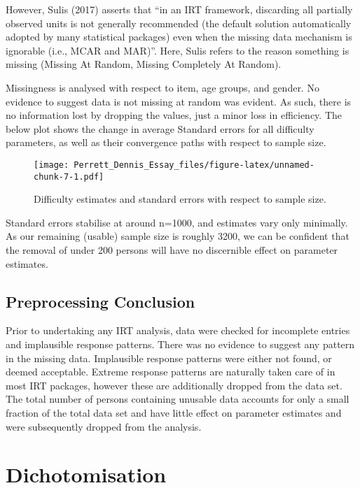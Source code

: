 \documentclass[
  man,floatsintext]{apa6}
\begin{document}
However, Sulis (2017) asserts that ``in an IRT framework, discarding all partially observed units is not generally recommended (the default solution automatically adopted by many statistical packages) even when the missing data mechanism is ignorable (i.e., MCAR and MAR)''. Here, Sulis refers to the reason something is missing (Missing At Random, Missing Completely At Random).

Missingness is analysed with respect to item, age groups, and gender. No evidence to suggest data is not missing at random was evident. As such, there is no information lost by dropping the values, just a minor loss in efficiency. The below plot shows the change in average Standard errors for all difficulty parameters, as well as their convergence paths with respect to sample size.

\begin{figure}
\centering
\texttt{[image: Perrett\_Dennis\_Essay\_files/figure-latex/unnamed-chunk-7-1.pdf]}
\caption{\label{fig:unnamed-chunk-7}Difficulty estimates and standard errors with respect to sample size.}
\end{figure}

Standard errors stabilise at around n=1000, and estimates vary only minimally. As our remaining (usable) sample size is roughly 3200, we can be confident that the removal of under 200 persons will have no discernible effect on parameter estimates.

\hypertarget{preprocessing-conclusion}{%
\subsection{Preprocessing Conclusion}\label{preprocessing-conclusion}}

Prior to undertaking any IRT analysis, data were checked for incomplete entries and implausible response patterns. There was no evidence to suggest any pattern in the missing data. Implausible response patterns were either not found, or deemed acceptable. Extreme response patterns are naturally taken care of in most IRT packages, however these are additionally dropped from the data set. The total number of persons containing unusable data accounts for only a small fraction of the total data set and have little effect on parameter estimates and were subsequently dropped from the analysis.

\hypertarget{dichotomisation}{%
\section{Dichotomisation}\label{dichotomisation}}
\end{document}
